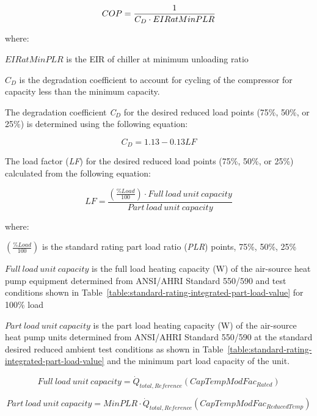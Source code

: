 \begin{equation}
COP = \frac{{\rm{1}}}{{{C_D} \cdot EIRatMinPLR}}
\end{equation}

where:

\(EIRatMinPLR\) is the EIR of chiller at minimum unloading ratio

\({C_D}\) is the degradation coefficient to account for cycling of the compressor for capacity less than the minimum capacity.

The degradation coefficient \emph{C\(_{D}\)} for the desired reduced load points (75\%, 50\%, or 25\%) is determined using the following equation:

\begin{equation}
{C_D} = 1.13 - 0.13LF
\end{equation}

The load factor (\emph{LF}) for the desired reduced load points (75\%, 50\%, or 25\%) calculated from the following equation:

\begin{equation}
LF = \frac{{\left( {\frac{{\% Load}}{{100}}} \right) \cdot Full~load~unit~capacity}}{{Part~load~unit~capacity}}
\end{equation}

where:

\emph{\(\left( {\frac{{\% Load}}{{100}}} \right)\)} is the standard rating part load ratio (\emph{PLR}) points, 75\%, 50\%, 25\%

\(Full~load~unit~capacity\) is the full load heating capacity (W) of the air-source heat pump equipment determined from ANSI/AHRI Standard 550/590 and test conditions shown in Table~\ref{table:standard-rating-integrated-part-load-value} for 100\% load

\(Part~load~unit~capacity\) is the part load heating capacity (W) of the air-source heat pump units determined from ANSI/AHRI Standard 550/590 at the standard desired reduced ambient test conditions as shown in Table~\ref{table:standard-rating-integrated-part-load-value} and the minimum part load capacity of the unit.

\begin{equation}
Full~load~unit~capacity = {\dot Q_{total,Reference}}\left( {CapTempModFa{c_{Rated}}} \right)
\end{equation}

\begin{equation}
Part~load~unit~capacity = MinPLR \cdot {\dot Q_{total,Reference}}\left( {CapTempModFa{c_{ReducedTemp}}} \right)
\end{equation}


